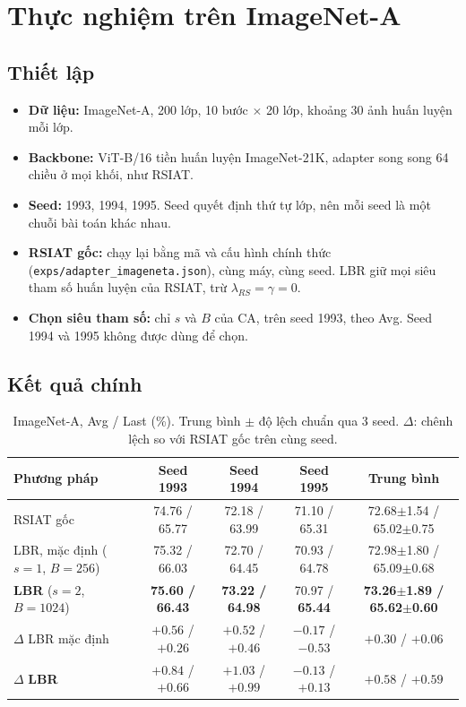 \documentclass[11pt]{article}
\begin{document}
\section{Thực nghiệm trên ImageNet-A}\label{sec:exp}

\subsection{Thiết lập}
\begin{itemize}
\item \textbf{Dữ liệu:} ImageNet-A, 200 lớp, 10 bước $\times$ 20 lớp, khoảng 30 ảnh huấn luyện mỗi lớp.
\item \textbf{Backbone:} ViT-B/16 tiền huấn luyện ImageNet-21K, adapter song song 64 chiều ở mọi khối, như RSIAT.
\item \textbf{Seed:} 1993, 1994, 1995. Seed quyết định thứ tự lớp, nên mỗi seed là một chuỗi bài toán khác nhau.
\item \textbf{RSIAT gốc:} chạy lại bằng mã và cấu hình chính thức (\texttt{exps/adapter\_imageneta.json}), cùng máy,
      cùng seed. LBR giữ mọi siêu tham số huấn luyện của RSIAT, trừ $\lambda_{RS}=\gamma=0$.
\item \textbf{Chọn siêu tham số:} chỉ $s$ và $B$ của CA, trên seed 1993, theo Avg. Seed 1994 và 1995 không được dùng
      để chọn.
\end{itemize}

\subsection{Kết quả chính}

\begin{table}[H]
\centering\small
\caption{ImageNet-A, Avg / Last (\%). Trung bình $\pm$ độ lệch chuẩn qua 3 seed. $\Delta$: chênh lệch so với RSIAT gốc
trên cùng seed.}
\label{tab:main}
\footnotesize
\setlength{\tabcolsep}{3pt}
\begin{tabular}{lcccc}
\toprule
Phương pháp & Seed 1993 & Seed 1994 & Seed 1995 & \textbf{Trung bình}\\
\midrule
RSIAT gốc \cite{rsiat} & 74.76 / 65.77 & 72.18 / 63.99 & 71.10 / 65.31 & 72.68$\pm$1.54 / 65.02$\pm$0.75\\
LBR, mặc định ($s{=}1$, $B{=}256$) & 75.32 / 66.03 & 72.70 / 64.45 & 70.93 / 64.78 & 72.98$\pm$1.80 / 65.09$\pm$0.68\\
\textbf{LBR} ($s{=}2$, $B{=}1024$) & \textbf{75.60 / 66.43} & \textbf{73.22 / 64.98} & 70.97 / \textbf{65.44} &
\textbf{73.26$\pm$1.89 / 65.62$\pm$0.60}\\
\midrule
$\Delta$ LBR mặc định & $+0.56$ / $+0.26$ & $+0.52$ / $+0.46$ & $-0.17$ / $-0.53$ & $+0.30$ / $+0.06$\\
$\Delta$ \textbf{LBR} & $+0.84$ / $+0.66$ & $+1.03$ / $+0.99$ & $-0.13$ / $+0.13$ & $\mathbf{+0.58}$ / $\mathbf{+0.59}$\\
\bottomrule
\end{tabular}
\end{table}
\end{document}
